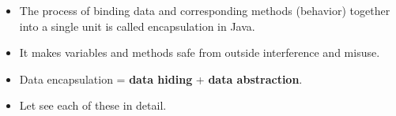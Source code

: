 \setlength{\columnsep}{3pt}
\begin{flushleft}

	\begin{itemize}
		\item The process of binding data and corresponding methods (behavior) together into a single unit is called encapsulation in Java.
		
		
		\item It makes variables and methods safe from outside interference and misuse.
	
		\item Data encapsulation = \textbf{data hiding} + \textbf{data abstraction}.
		\item Let see each of these in detail.
	\end{itemize}	

\end{flushleft}
\newpage